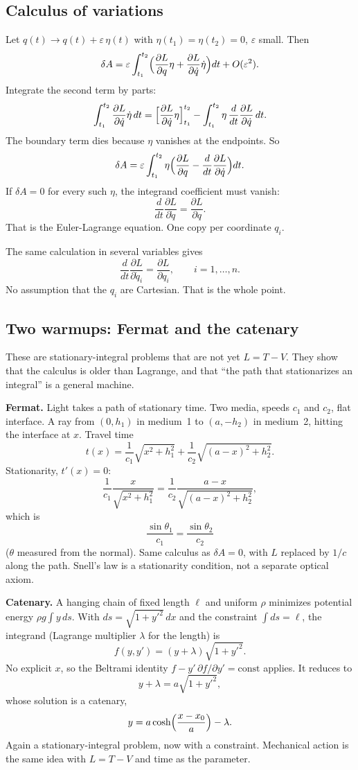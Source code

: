 \documentclass[11pt]{article}
\numberwithin{equation}{section}
\newcommand{\qdot}{\dot{q}}
\newcommand{\ddt}{\frac{d}{dt}}
\newcommand{\pd}[2]{\frac{\partial #1}{\partial #2}}
\begin{document}
\subsection{Calculus of variations}

Let $q(t)\to q(t)+\varepsilon\,\eta(t)$ with $\eta(t_1)=\eta(t_2)=0$, $\varepsilon$ small. Then
\[
\delta A
= \varepsilon\int_{t_1}^{t_2}\Bigl(
\pd{L}{q}\eta + \pd{L}{\qdot}\dot\eta\Bigr)dt
+ O(\varepsilon^2).
\]
Integrate the second term by parts:
\[
\int_{t_1}^{t_2}\pd{L}{\qdot}\dot\eta\,dt
= \Bigl[\pd{L}{\qdot}\eta\Bigr]_{t_1}^{t_2}
- \int_{t_1}^{t_2}\eta\,\ddt\pd{L}{\qdot}\,dt.
\]
The boundary term dies because $\eta$ vanishes at the endpoints. So
\[
\delta A = \varepsilon\int_{t_1}^{t_2}\eta\Bigl(
\pd{L}{q} - \ddt\pd{L}{\qdot}\Bigr)dt.
\]
If $\delta A=0$ for every such $\eta$, the integrand coefficient must vanish:
\begin{equation}
\label{eq:EL}
\ddt\pd{L}{\qdot} = \pd{L}{q}.
\end{equation}
That is the Euler-Lagrange equation. One copy per coordinate $q_i$.

The same calculation in several variables gives
\[
\ddt\pd{L}{\qdot_i} = \pd{L}{q_i},\qquad i=1,\ldots,n.
\]
No assumption that the $q_i$ are Cartesian. That is the whole point.

\subsection{Two warmups: Fermat and the catenary}

These are stationary-integral problems that are not yet $L=T-V$. They show that the calculus is older than Lagrange, and that ``the path that stationarizes an integral'' is a general machine.

\textbf{Fermat.} Light takes a path of stationary time. Two media, speeds $c_1$ and $c_2$, flat interface. A ray from $(0,h_1)$ in medium~1 to $(a,-h_2)$ in medium~2, hitting the interface at $x$. Travel time
\[
t(x) = \frac{1}{c_1}\sqrt{x^2+h_1^2} + \frac{1}{c_2}\sqrt{(a-x)^2+h_2^2}.
\]
Stationarity, $t'(x)=0$:
\[
\frac{1}{c_1}\frac{x}{\sqrt{x^2+h_1^2}}
= \frac{1}{c_2}\frac{a-x}{\sqrt{(a-x)^2+h_2^2}},
\]
which is
\[
\frac{\sin\theta_1}{c_1} = \frac{\sin\theta_2}{c_2}
\]
($\theta$ measured from the normal). Same calculus as $\delta A=0$, with $L$ replaced by $1/c$ along the path. Snell's law is a stationarity condition, not a separate optical axiom.

\textbf{Catenary.} A hanging chain of fixed length $\ell$ and uniform $\rho$ minimizes potential energy $\rho g\int y\,ds$. With $ds=\sqrt{1+y'^2}\,dx$ and the constraint $\int ds=\ell$, the integrand (Lagrange multiplier $\lambda$ for the length) is
\[
f(y,y') = (y+\lambda)\sqrt{1+y'^2}.
\]
No explicit $x$, so the Beltrami identity $f-y'\,\partial f/\partial y'=\mathrm{const}$ applies. It reduces to
\[
y+\lambda = a\sqrt{1+y'^2},
\]
whose solution is a catenary,
\[
y = a\cosh\Bigl(\frac{x-x_0}{a}\Bigr) - \lambda.
\]
Again a stationary-integral problem, now with a constraint. Mechanical action is the same idea with $L=T-V$ and time as the parameter.
\end{document}
